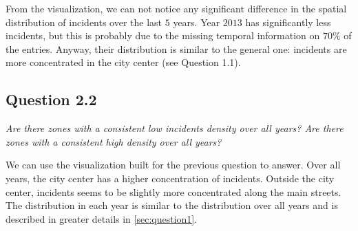 From the visualization, we can not notice any significant difference in the spatial distribution of incidents over the last $5$ years.
Year $2013$ has significantly less incidents, but this is probably due to the missing temporal information on $70\%$ of the entries.
Anyway, their distribution is similar to the general one: incidents are more concentrated in the city center (see Question 1.1).


\subsection*{Question 2.2}
\textit{Are there zones with a consistent low incidents density over all years? Are there zones with a consistent high density over all years?}

We can use the visualization built for the previous question to answer.
Over all years, the city center has a higher concentration of incidents.
Outside the city center, incidents seems to be slightly more concentrated along the main streets.
The distribution in each year is similar to the distribution over all years and is described in greater details in \cref{sec:question1}.
